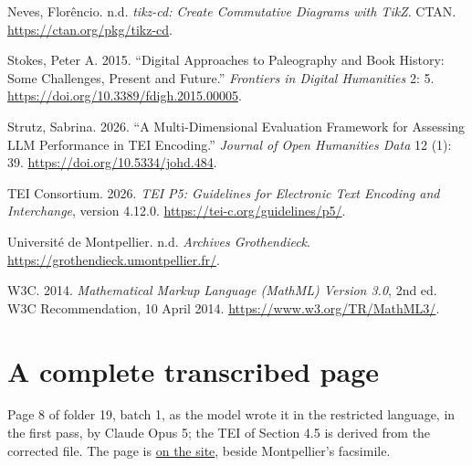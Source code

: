 \documentclass[11pt]{article}
\newcommand{\qq}[1]{“#1”}
\newcommand{\lf}[3]{\href{https://grothendieck.commutator.io/\##1/#2}{#3}}
\begin{document}
\begin{list}{}{\setlength{\leftmargin}{1.5em}\setlength{\itemindent}{-1.5em}\setlength{\itemsep}{3pt}}
\item Neves, Florêncio. n.d. \emph{tikz-cd: Create Commutative Diagrams with TikZ}. CTAN. \url{https://ctan.org/pkg/tikz-cd}.
\item Stokes, Peter A. 2015. \qq{Digital Approaches to Paleography and Book History: Some Challenges, Present and Future.} \emph{Frontiers in Digital Humanities} 2: 5. \url{https://doi.org/10.3389/fdigh.2015.00005}.
\item Strutz, Sabrina. 2026. \qq{A Multi-Dimensional Evaluation Framework for Assessing LLM Performance in TEI Encoding.} \emph{Journal of Open Humanities Data} 12 (1): 39. \url{https://doi.org/10.5334/johd.484}.
\item TEI Consortium. 2026. \emph{TEI P5: Guidelines for Electronic Text Encoding and Interchange}, version 4.12.0. \url{https://tei-c.org/guidelines/p5/}.
\item Université de Montpellier. n.d. \emph{Archives Grothendieck}. \url{https://grothendieck.umontpellier.fr/}.
\item W3C. 2014. \emph{Mathematical Markup Language (MathML) Version 3.0}, 2nd ed. W3C Recommendation, 10 April 2014. \url{https://www.w3.org/TR/MathML3/}.
\end{list}

\appendix
\section{A complete transcribed page}

Page 8 of folder 19, batch 1, as the model wrote it in the restricted language, in the first pass, by Claude Opus 5; the TEI of Section 4.5 is derived from the corrected file. The page is \lf{19}{1/p8}{on the site}, beside Montpellier's facsimile.
\end{document}
